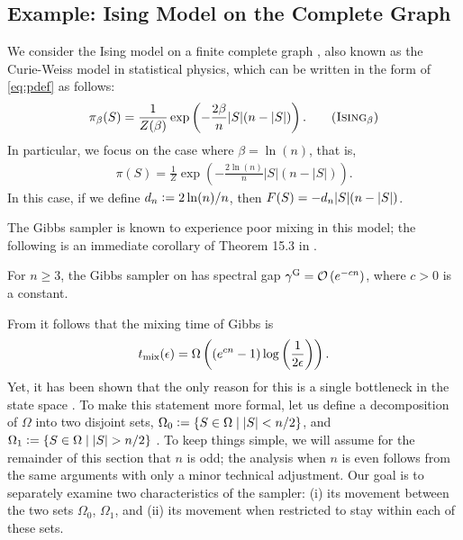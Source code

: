 \subsection{Example: Ising Model on the Complete Graph} \label{sect:ising}
We consider the Ising model on a finite complete graph \citep{levin08}, also known as the Curie-Weiss model in statistical physics, which can be written in the form of \eqref{eq:pdef} as follows:
\begin{align*}
  \pib(S) = \frac{1}{Z(\beta)}\exp\left(-\frac{2\beta}{n} |S|(n-|S|)\right). \tag{\isingb}
\end{align*}
In particular, we focus on the case where $\beta = \ln(n)$, that is,
\begin{align*}
  \pi(S) = \frac{1}{Z}\exp\left(-\frac{2\ln(n)}{n} |S|(n-|S|)\right). \tag{\ising}
\end{align*}
In this case, if we define $d_n \vcentcolon= 2 \ln(n) / n$, then $F(S) = -d_n |S|(n-|S|)$.

The Gibbs sampler is known to experience poor mixing in this model; the following is an immediate corollary of Theorem 15.3 in \citep{levin08book}.
\begin{cor}
  For $n \geq 3$, the Gibbs sampler on \ising{} has spectral gap $\gamma^{\mathrm{G}} = \mathcal{O}\left(e^{-cn}\right)$, where $c > 0$ is a constant.
\end{cor}
\noindent From  it follows that the mixing time of Gibbs is
\begin{align*}
    t_{\mathrm{mix}}(\epsilon) = \Omega\left((e^{cn} - 1)\log\left(\frac{1}{2\epsilon}\right) \right).
\end{align*}
Yet, it has been shown that the only reason for this is a single bottleneck in the state space \citep{levin08}.
To make this statement more formal, let us define a decomposition of $\Omega$ into two disjoint sets, $\Omega_0 \vcentcolon= \{S \in \Omega \mid |S| < n/2\}$, and $\Omega_1 \vcentcolon= \{S \in \Omega \mid |S| > n/2\}$ \citep{jerrum04poincare}.
To keep things simple, we will assume for the remainder of this section that $n$ is odd; the analysis when $n$ is even follows from the same arguments with only a minor technical adjustment.
Our goal is to separately examine two characteristics of the sampler: (i) its movement between the two sets $\Omega_0$, $\Omega_1$, and (ii) its movement when restricted to stay within each of these sets.

